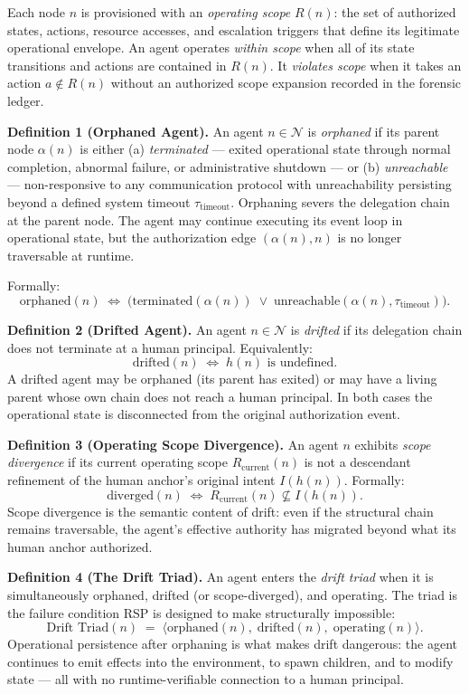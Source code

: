 Each node $n$ is provisioned with an \emph{operating scope} $R(n)$: the set of authorized states, actions, resource accesses, and escalation triggers that define its legitimate operational envelope.  An agent operates \emph{within scope} when all of its state transitions and actions are contained in $R(n)$.  It \emph{violates scope} when it takes an action $a \notin R(n)$ without an authorized scope expansion recorded in the forensic ledger.

\medskip
\noindent\textbf{Definition 1 (Orphaned Agent).}  An agent $n \in \mathcal{N}$ is \emph{orphaned} if its parent node $\alpha(n)$ is either (a) \emph{terminated} — exited operational state through normal completion, abnormal failure, or administrative shutdown — or (b) \emph{unreachable} — non-responsive to any communication protocol with unreachability persisting beyond a defined system timeout $\tau_{\text{timeout}}$.  Orphaning severs the delegation chain at the parent node.  The agent may continue executing its event loop in operational state, but the authorization edge $(\alpha(n), n)$ is no longer traversable at runtime.

Formally:
\[
\text{orphaned}(n) \;\Longleftrightarrow\; \bigl(\text{terminated}(\alpha(n)) \;\lor\; \text{unreachable}(\alpha(n), \tau_{\text{timeout}})\bigr).
\tag{2}
\]

\medskip
\noindent\textbf{Definition 2 (Drifted Agent).}  An agent $n \in \mathcal{N}$ is \emph{drifted} if its delegation chain does not terminate at a human principal.  Equivalently:
\[
\text{drifted}(n) \;\Longleftrightarrow\; h(n) \text{ is undefined}.
\tag{3}
\]
A drifted agent may be orphaned (its parent has exited) or may have a living parent whose own chain does not reach a human principal.  In both cases the operational state is disconnected from the original authorization event.

\medskip
\noindent\textbf{Definition 3 (Operating Scope Divergence).}  An agent $n$ exhibits \emph{scope divergence} if its current operating scope $R_{\text{current}}(n)$ is not a descendant refinement of the human anchor's original intent $I(h(n))$.  Formally:
\[
\text{diverged}(n) \;\Longleftrightarrow\; R_{\text{current}}(n) \not\subseteq I(h(n)).
\tag{4}
\]
Scope divergence is the semantic content of drift: even if the structural chain remains traversable, the agent's effective authority has migrated beyond what its human anchor authorized.

\medskip
\noindent\textbf{Definition 4 (The Drift Triad).}  An agent enters the \emph{drift triad} when it is simultaneously orphaned, drifted (or scope-diverged), and operating.  The triad is the failure condition RSP is designed to make structurally impossible:
\[
\text{Drift Triad}(n) \;=\; \bigl\langle \text{orphaned}(n),\; \text{drifted}(n),\; \text{operating}(n) \bigr\rangle.
\tag{5}
\]
Operational persistence after orphaning is what makes drift dangerous: the agent continues to emit effects into the environment, to spawn children, and to modify state — all with no runtime-verifiable connection to a human principal.


